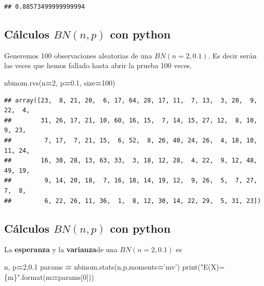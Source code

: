 \documentclass[]{book}
\newenvironment{Shaded}{\begin{snugshade}}{\end{snugshade}}
\newcommand{\BuiltInTok}[1]{#1}
\newcommand{\DecValTok}[1]{\textcolor[rgb]{0.00,0.00,0.81}{#1}}
\newcommand{\FloatTok}[1]{\textcolor[rgb]{0.00,0.00,0.81}{#1}}
\newcommand{\NormalTok}[1]{#1}
\newcommand{\OperatorTok}[1]{\textcolor[rgb]{0.81,0.36,0.00}{\textbf{#1}}}
\newcommand{\SpecialCharTok}[1]{\textcolor[rgb]{0.00,0.00,0.00}{#1}}
\newcommand{\StringTok}[1]{\textcolor[rgb]{0.31,0.60,0.02}{#1}}
\begin{document}
\begin{verbatim}
## 0.88573499999999994
\end{verbatim}

\hypertarget{cuxe1lculos-bnnp-con-python-1}{%
\subsection{\texorpdfstring{Cálculos \(BN(n,p)\) con python}{Cálculos BN(n,p) con python}}\label{cuxe1lculos-bnnp-con-python-1}}

Generemos 100 observaciones aleatorias de una \(BN(n=2,0.1)\). Es decir serán las veces que hemos fallado hasta abrir la prueba 100 veces.

\begin{Shaded}
\begin{Highlighting}[]
\NormalTok{nbinom.rvs(n}\OperatorTok{=}\DecValTok{2}\NormalTok{, p}\OperatorTok{=}\FloatTok{0.1}\NormalTok{, size}\OperatorTok{=}\DecValTok{100}\NormalTok{)}
\end{Highlighting}
\end{Shaded}

\begin{verbatim}
## array([23,  8, 21, 20,  6, 17, 64, 28, 17, 11,  7, 13,  3, 20,  9, 22,  4,
##        31, 26, 17, 21, 10, 60, 16, 15,  7, 14, 15, 27, 12,  8, 10,  9, 23,
##         7, 17,  7, 21, 15,  6, 52,  8, 26, 40, 24, 26,  4, 18, 10, 11, 24,
##        16, 30, 28, 13, 63, 33,  3, 18, 12, 28,  4, 22,  9, 12, 48, 49, 19,
##         9, 14, 20, 18,  7, 16, 18, 14, 19, 12,  9, 26,  5,  7, 27,  7,  8,
##         6, 22, 26, 11, 36,  1,  8, 12, 30, 14, 22, 29,  5, 31, 23])
\end{verbatim}

\hypertarget{cuxe1lculos-bnnp-con-python-2}{%
\subsection{\texorpdfstring{Cálculos \(BN(n,p)\) con python}{Cálculos BN(n,p) con python}}\label{cuxe1lculos-bnnp-con-python-2}}

La \textbf{esperanza} y la \textbf{varianza}de una \(BN(n=2,0.1)\) es

\begin{Shaded}
\begin{Highlighting}[]
\NormalTok{n, p}\OperatorTok{=}\DecValTok{2}\NormalTok{,}\FloatTok{0.1}
\NormalTok{params }\OperatorTok{=}\NormalTok{ nbinom.stats(n,p,moments}\OperatorTok{=}\StringTok{'mv'}\NormalTok{)}
\BuiltInTok{print}\NormalTok{(}\StringTok{"E(X)=}\SpecialCharTok{\{m\}}\StringTok{"}\NormalTok{.}\BuiltInTok{format}\NormalTok{(m}\OperatorTok{=}\NormalTok{params[}\DecValTok{0}\NormalTok{]))}
\end{Highlighting}
\end{Shaded}
\end{document}
